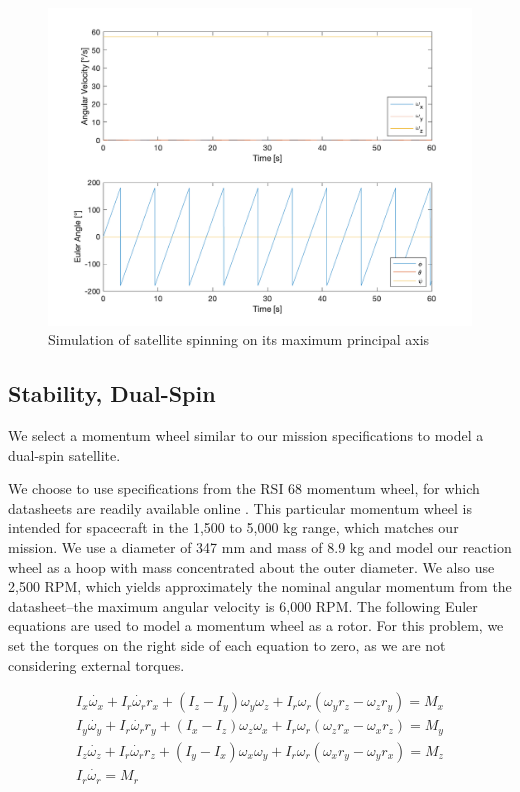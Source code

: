 \begin{figure}[H]
\centering
\includegraphics[scale=0.6]{Images/ps4_problem2a_3.png}
\caption{Simulation of satellite spinning on its maximum principal axis}
\label{fig:ps4_problem2a_3}
\end{figure}

\subsection{Stability, Dual-Spin}
We select a momentum wheel similar to our mission specifications to model a dual-spin satellite.

We choose to use specifications from the RSI 68 momentum wheel, for which datasheets are readily available online \cite{RSI68}. This particular momentum wheel is intended for spacecraft in the 1,500 to 5,000 kg range, which matches our mission. We use a diameter of 347 mm and mass of 8.9 kg and model our reaction wheel as a hoop with mass concentrated about the outer diameter. We also use 2,500 RPM, which yields approximately the nominal angular momentum from the datasheet–the maximum angular velocity is 6,000 RPM. The following Euler equations are used to model a momentum wheel as a rotor. For this problem, we set the torques on the right side of each equation to zero, as we are not considering external torques.

\begin{align*}
    I_x \dot{\omega_x} + I_r \dot{\omega_r} r_x + (I_z - I_y) \omega_y \omega_z 
    + I_r \omega_r (\omega_y r_z - \omega_z r_y) = M_x \\
    I_y \dot{\omega_y} + I_r \dot{\omega_r} r_y + (I_x - I_z) \omega_z \omega_x 
    + I_r \omega_r (\omega_z r_x - \omega_x r_z) = M_y \\
    I_z \dot{\omega_z} + I_r \dot{\omega_r} r_z + (I_y - I_x) \omega_x \omega_y 
    + I_r \omega_r (\omega_x r_y - \omega_y r_x) = M_z \\
    I_r \dot{\omega_r} = M_r
\end{align*}

